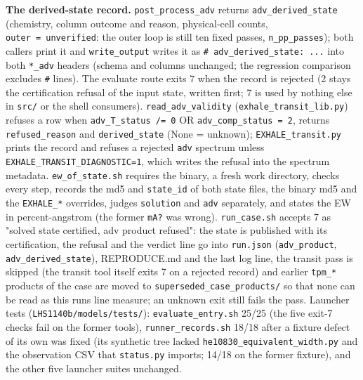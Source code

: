 \documentclass[english,a4paper]{my_memo}
\begin{document}
\textbf{The derived-state record.} \texttt{post\_process\_adv} returns \texttt{adv\_derived\_state}
(chemistry, column outcome and reason, physical-cell counts, \texttt{outer\ =\ unverified}: the outer loop is still ten fixed passes, \texttt{n\_pp\_passes}); both
callers print it and \texttt{write\_output} writes it as \texttt{\#\ adv\_derived\_state:\ ...}
into both \texttt{*\_adv} headers (schema and columns unchanged; the regression
comparison excludes \texttt{\#} lines). The evaluate route exits 7 when the record
is rejected (2 stays the certification refusal of the input state, written
first; 7 is used by nothing else in \texttt{src/} or the shell consumers).
\texttt{read\_adv\_validity} (\texttt{exhale\_transit\_lib.py}) refuses a row when
\texttt{adv\_T\_status\ /=\ 0} OR \texttt{adv\_comp\_status\ =\ 2}, returns \texttt{refused\_reason} and
\texttt{derived\_state} (None = unknown); \texttt{EXHALE\_transit.py} prints the record and
refuses a rejected \texttt{adv} spectrum unless \texttt{EXHALE\_TRANSIT\_DIAGNOSTIC=1}, which
writes the refusal into the spectrum metadata. \texttt{ew\_of\_state.sh} requires the
binary, a fresh work directory, checks every step, records the md5 and
\texttt{state\_id} of both state files, the binary md5 and the \texttt{EXHALE\_*} overrides,
judges \texttt{solution} and \texttt{adv} separately, and states the EW in
percent-angstrom (the former \texttt{mA?} was wrong). \texttt{run\_case.sh} accepts 7 as
"solved state certified, adv product refused": the state is published with
its certification, the refusal and the verdict line go into \texttt{run.json}
(\texttt{adv\_product}, \texttt{adv\_derived\_state}), REPRODUCE.md and the last log line,
the transit pass is skipped (the transit tool itself exits 7 on a rejected
record) and earlier \texttt{tpm\_*} products of the case are moved to
\texttt{superseded\_case\_products/} so that none can be read as this run\textquotesingle s line
measure; an unknown exit still fails the pass. Launcher tests
(\texttt{LHS1140b/models/tests/}): \texttt{evaluate\_entry.sh} 25/25 (the five exit-7
checks fail on the former tools), \texttt{runner\_records.sh} 18/18 after a fixture
defect of its own was fixed (its synthetic tree lacked
\texttt{he10830\_equivalent\_width.py} and the observation CSV that \texttt{status.py}
imports; 14/18 on the former fixture), and the other five launcher suites
unchanged.
\end{document}
